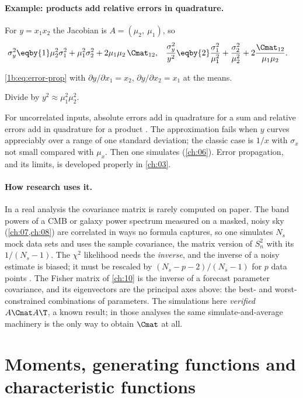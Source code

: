 \paragraph{Example: products add relative errors in quadrature.}
For $y=x_1x_2$ the Jacobian is $A=(\mu_2,\ \mu_1)$, so
\begin{align*}
  \sigma_y^2
  &\eqby{1} \mu_2^2\sigma_1^2+\mu_1^2\sigma_2^2+2\mu_1\mu_2\,\Cmat_{12},
  &
  \frac{\sigma_y^2}{y^2}
  &\eqby{2} \frac{\sigma_1^2}{\mu_1^2}+\frac{\sigma_2^2}{\mu_2^2}
            +2\frac{\Cmat_{12}}{\mu_1\mu_2} .
\end{align*}
\begin{explain}
  \item \eqref{1b:eq:error-prop} with $\partial y/\partial x_1=x_2$,
        $\partial y/\partial x_2=x_1$ at the means.
  \item Divide by $y^2\approx\mu_1^2\mu_2^2$.
\end{explain}
For uncorrelated inputs, absolute errors add in quadrature for a sum and
relative errors add in quadrature for a product .
The approximation fails when $y$ curves appreciably over a range of one
standard deviation; the classic case is $1/x$ with $\sigma_x$ not small
compared with $\mu_x$. Then one simulates (\cref{ch:06}). Error propagation,
and its limits, is developed properly in \cref{ch:03}.

\paragraph{How research uses it.} In a real analysis the covariance matrix is rarely computed on paper. The
band powers of a CMB or galaxy power spectrum measured on a masked, noisy sky
(\cref{ch:07,ch:08}) are correlated in ways no formula captures, so one
simulates $N_s$ mock data sets and uses the sample covariance, the matrix
version of $S_n^2$ with its $1/(N_s-1)$. The $\chi^2$ likelihood needs the
\emph{inverse}, and the inverse of a noisy estimate is biased; it must be
rescaled by $(N_s-p-2)/(N_s-1)$ for $p$ data points \cite{Hartlap2007}. The
Fisher matrix of \cref{ch:10} is the inverse of a forecast parameter
covariance, and its eigenvectors are the principal axes above: the
best- and worst-constrained combinations of parameters. The simulations here
\emph{verified} $A\Cmat A\T$, a known result; in those analyses the same
simulate-and-average machinery is the only way to obtain $\Cmat$ at all.
\section{Moments, generating functions and characteristic functions}
\label{1b:sec:moments}

